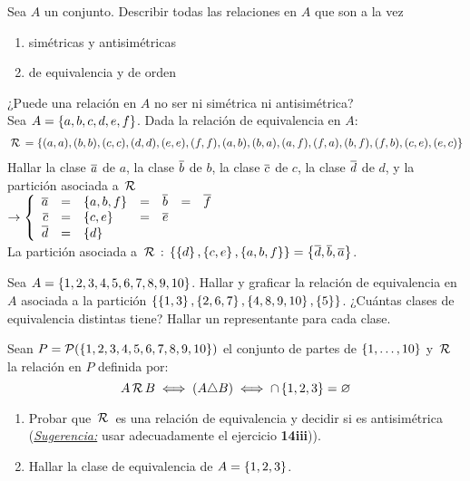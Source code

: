 \documentclass[12pt,a4paper, spanish]{article}
\begin{document}
\begin{enumerate}[label=\roman*)]
\end{enumerate}
\ejercicio
Sea $A$ un conjunto. Describir todas las relaciones en $A$ que son a la vez
\begin{multicols}{2}
	\begin{enumerate}[label=\roman*)]
		\item simétricas y antisimétricas\\ 
		\item de equivalencia y de orden\\ 
	\end{enumerate}
\end{multicols}

¿Puede una relación en $A$ no ser ni simétrica ni antisimétrica? \\

\ejercicio
Sea $A = \set{a, b, c, d, e, f}$. Dada la relación de equivalencia en $A$:
\begin{align*}
	\relacion = \set{(a, a), (b, b), (c, c), (d, d), (e, e), (f, f), (a, b), (b, a), (a, f), (f, a), (b, f), (f, b), (c, e), (e, c)}
\end{align*}
Hallar la clase $\clase{a}$ de $a$, la clase $\clase{b}$ de $b$, la clase $\clase{c}$ de $c$, la clase $\clase{d}$ de $d$, y la partición asociada a $\relacion$ \\
\veinticuatro
$\to
	\llave{rclclcl}{
		\clase{a} & = & \set{a, b, f}  & = & \clase{b} & = & \clase{f} \\
		\clase{c} & = & \set{c, e}     & = & \clase{e} &   & \\
		\clase{d} & = & \set{d}        &   &         &   & \\
	}$ \\
La partición asociada a $\relacion:\,  \set{\set{d}, \set{c,e}, \set{a, b, f}} = \set{\clase{d}, \clase{b}, \clase{a}}$.

\ejercicio
\Hacer
Sea $A = \set{1,2,3,4,5,6,7,8,9,10}$. Hallar y graficar la relación de equivalencia en $A$ asociada a la partición $\set{ \set{1,3}, \set{2,6,7}, \set{4,8,9,10}, \set{5} }$.
¿Cuántas clases de equivalencia distintas tiene? Hallar un representante para cada clase.

\ejercicio
\Hacer
Sean $P = \partes(\set{1,2,3,4,5,6,7,8,9,10})$ el conjunto de partes de $\set{1,\dots, 10}$ y $\relacion$ la relación en $P$ definida por:
\[
	A \relacion B \sisolosi (A \triangle B) \sisolosi \inter \set{1,2,3} = \vacio
\]
\begin{enumerate}[label=\roman*)]
	\item  Probar que $\relacion$ es una relación de equivalencia y decidir si es antisimétrica (\textit{\underline{Sugerencia:}} usar adecuadamente el ejercicio \textbf{14iii})).
	\item Hallar la clase de equivalencia de $A = \set{1,2,3}$.
\end{enumerate}
\end{document}
